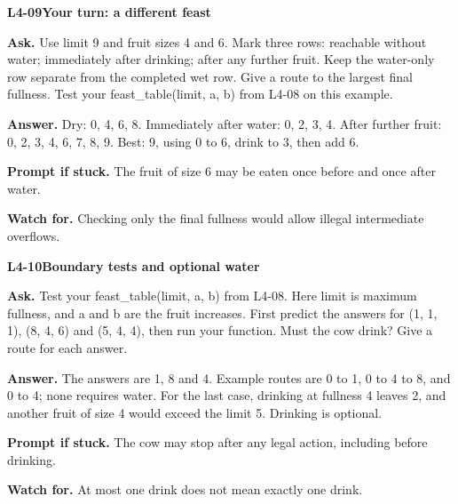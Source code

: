 \documentclass[11pt,a4paper]{article}
\begin{document}
\par\medskip
\noindent\begin{minipage}{\textwidth}
{\color{teal}\textbf{L4-09}}\quad \textbf{Your turn: a different feast}\par\smallskip
\textbf{Ask.} Use limit 9 and fruit sizes 4 and 6. Mark three rows: reachable without water; immediately after drinking; after any further fruit. Keep the water-only row separate from the completed wet row. Give a route to the largest final fullness. Test your feast\_table(limit, a, b) from L4-08 on this example.\par\smallskip
\textbf{Answer.} Dry: 0, 4, 6, 8. Immediately after water: 0, 2, 3, 4. After further fruit: 0, 2, 3, 4, 6, 7, 8, 9. Best: 9, using 0 to 6, drink to 3, then add 6.\par\smallskip
\textbf{Prompt if stuck.} The fruit of size 6 may be eaten once before and once after water.\par\smallskip
\textbf{Watch for.} Checking only the final fullness would allow illegal intermediate overflows.
\end{minipage}\par{}\medskip

\noindent\begin{minipage}{\textwidth}
{\color{teal}\textbf{L4-10}}\quad \textbf{Boundary tests and optional water}\par\smallskip
\textbf{Ask.} Test your feast\_table(limit, a, b) from L4-08. Here limit is maximum fullness, and a and b are the fruit increases. First predict the answers for (1, 1, 1), (8, 4, 6) and (5, 4, 4), then run your function. Must the cow drink? Give a route for each answer.\par\smallskip
\textbf{Answer.} The answers are 1, 8 and 4. Example routes are 0 to 1, 0 to 4 to 8, and 0 to 4; none requires water. For the last case, drinking at fullness 4 leaves 2, and another fruit of size 4 would exceed the limit 5. Drinking is optional.\par\smallskip
\textbf{Prompt if stuck.} The cow may stop after any legal action, including before drinking.\par\smallskip
\textbf{Watch for.} At most one drink does not mean exactly one drink.
\end{minipage}\par{}\medskip
\end{document}
